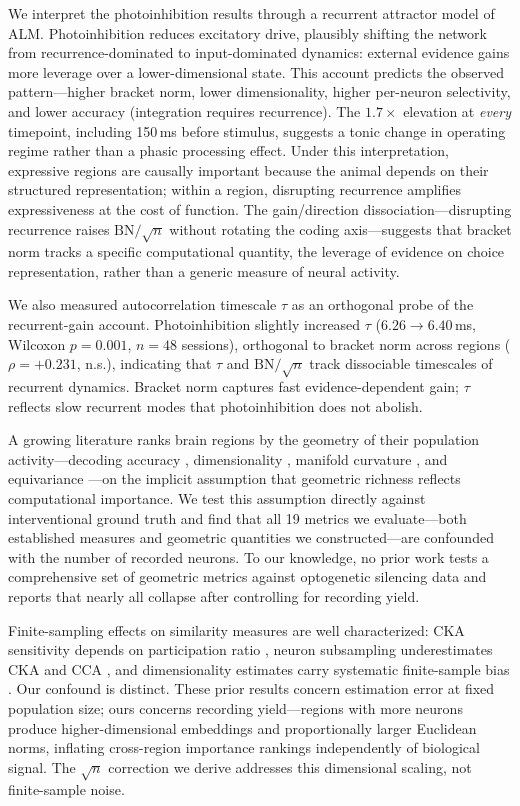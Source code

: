 \documentclass[9pt,lineno]{elife}
\begin{document}
We interpret the photoinhibition results through a recurrent attractor model of ALM. Photoinhibition reduces excitatory drive, plausibly shifting the network from recurrence-dominated to input-dominated dynamics: external evidence gains more leverage over a lower-dimensional state. This account predicts the observed pattern---higher bracket norm, lower dimensionality, higher per-neuron selectivity, and lower accuracy (integration requires recurrence). The $1.7\times$ elevation at \emph{every} timepoint, including 150\,ms before stimulus, suggests a tonic change in operating regime rather than a phasic processing effect. Under this interpretation, expressive regions are causally important because the animal depends on their structured representation; within a region, disrupting recurrence amplifies expressiveness at the cost of function. The gain/direction dissociation---disrupting recurrence raises $\text{BN}/\!\sqrt{n}$ without rotating the coding axis---suggests that bracket norm tracks a specific computational quantity, the leverage of evidence on choice representation, rather than a generic measure of neural activity.

We also measured autocorrelation timescale $\tau$ as an orthogonal probe of the recurrent-gain account. Photoinhibition slightly increased $\tau$ ($6.26 \to 6.40$\,ms, Wilcoxon $p = 0.001$, $n = 48$ sessions), orthogonal to bracket norm across regions ($\rho = +0.231$, n.s.), indicating that $\tau$ and $\text{BN}/\!\sqrt{n}$ track dissociable timescales of recurrent dynamics. Bracket norm captures fast evidence-dependent gain; $\tau$ reflects slow recurrent modes that photoinhibition does not abolish.

A growing literature ranks brain regions by the geometry of their population activity---decoding accuracy \citep{steinmetz2019distributed}, dimensionality \citep{cunningham2014dimensionality, stringer2019high}, manifold curvature \citep{gardner2022toroidal}, and equivariance \citep{ostrow2023beyond}---on the implicit assumption that geometric richness reflects computational importance. We test this assumption directly against interventional ground truth and find that all 19 metrics we evaluate---both established measures and geometric quantities we constructed---are confounded with the number of recorded neurons. To our knowledge, no prior work tests a comprehensive set of geometric metrics against optogenetic silencing data and reports that nearly all collapse after controlling for recording yield.

Finite-sampling effects on similarity measures are well characterized: CKA sensitivity depends on participation ratio \citep{harvey2024representational}, neuron subsampling underestimates CKA and CCA \citep{murphy2024biased}, and dimensionality estimates carry systematic finite-sample bias \citep{chung2026dimensionality, spectral2025neurips}. Our confound is distinct. These prior results concern estimation error at fixed population size; ours concerns recording yield---regions with more neurons produce higher-dimensional embeddings and proportionally larger Euclidean norms, inflating cross-region importance rankings independently of biological signal. The $\sqrt{n}$ correction we derive addresses this dimensional scaling, not finite-sample noise.
\end{document}
